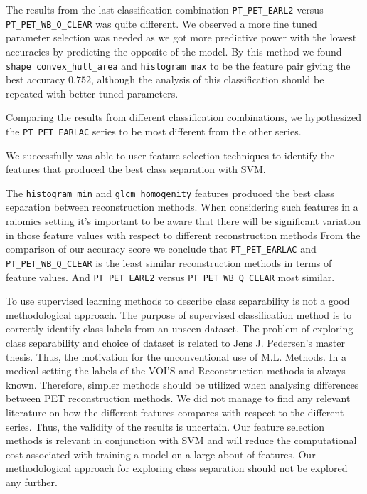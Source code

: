 The results from the last classification combination
 \verb|PT_PET_EARL2| versus \verb|PT_PET_WB_Q_CLEAR| was quite different. 
 We observed a more fine tuned 
 parameter selection was needed as we got more predictive power with the lowest accuracies by predicting the 
 opposite of the model. By this method we found \verb|shape convex_hull_area| and \verb|histogram max| 
 to be the feature pair giving the best accuracy $0.752$, although the analysis of this classification 
 should be repeated with better tuned parameters.  



 Comparing the results from different classification combinations, we hypothesized the \verb|PT_PET_EARLAC| 
 series to be most different from the other series. 


 We successfully was able to user feature selection techniques to identify the
 features that produced the best class separation with SVM.     

The \verb|histogram min| and \verb|glcm homogenity| features produced the best
class separation between reconstruction methods.     
When considering such features in a raiomics setting it's important to be
aware that there will be significant variation in those feature values with
respect to different reconstruction methods
From the comparison of our accuracy score we conclude that    
\verb|PT_PET_EARLAC| and \verb|PT_PET_WB_Q_CLEAR|
is the least similar reconstruction methods  in terms of feature values.   
And \verb|PT_PET_EARL2| versus \verb|PT_PET_WB_Q_CLEAR| most similar. 


To use supervised learning methods to describe class separability is not a
good methodological approach. The purpose of supervised classification
method is to correctly identify class labels from an unseen dataset.     
The problem of exploring class separability and choice of dataset is
related to Jens J. Pedersen's master thesis. Thus, the motivation for the 
unconventional use of M.L. Methods. In a medical setting the labels of the
VOI'S and Reconstruction methods is always known. Therefore, simpler methods
should be utilized when analysing differences between PET reconstruction
methods. We did not manage to find any relevant literature on how the different features compares
with respect to the different series. Thus, the validity of the results is
uncertain. Our feature selection methods is relevant in conjunction with SVM and
will reduce the computational cost associated with training a model on a large
about of features. Our methodological approach for exploring class separation
should not be explored any further. 
 




% 
